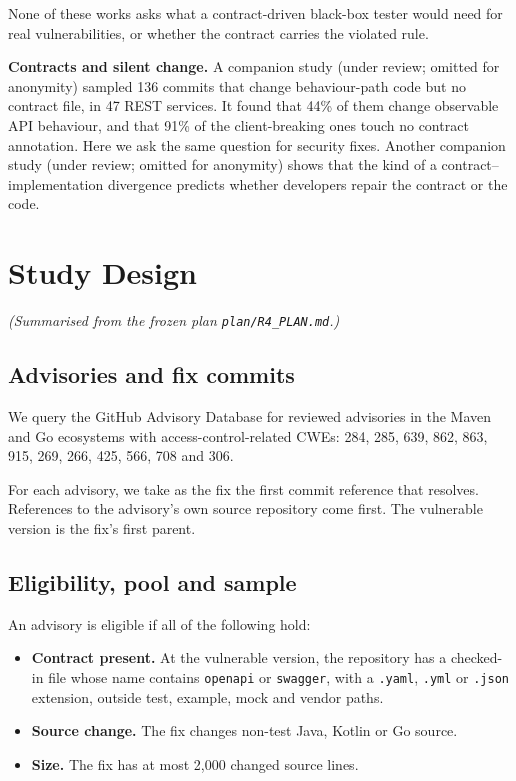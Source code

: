 \documentclass[conference]{IEEEtran}
\begin{document}
None of these works asks what a contract-driven black-box tester would need for real vulnerabilities, or whether the contract carries the violated rule.

\textbf{Contracts and silent change.} A companion study (under review; omitted for anonymity) sampled 136 commits that change behaviour-path code but no contract file, in 47 REST services. It found that 44\% of them change observable API behaviour, and that 91\% of the client-breaking ones touch no contract annotation. Here we ask the same question for security fixes. Another companion study (under review; omitted for anonymity) shows that the kind of a contract--implementation divergence predicts whether developers repair the contract or the code.

\section{Study Design}
\emph{(Summarised from the frozen plan \texttt{plan/\allowbreak{}R4\_PLAN.md}.)}

\subsection{Advisories and fix commits}
We query the GitHub Advisory Database for reviewed advisories in the Maven and Go ecosystems with access-control-related CWEs: 284, 285, 639, 862, 863, 915, 269, 266, 425, 566, 708 and 306.

For each advisory, we take as the fix the first commit reference that resolves. References to the advisory's own source repository come first. The vulnerable version is the fix's first parent.

\subsection{Eligibility, pool and sample}
An advisory is eligible if all of the following hold:
\begin{itemize}
\item \textbf{Contract present.} At the vulnerable version, the repository has a checked-in file whose name contains \texttt{openapi} or \texttt{swagger}, with a \texttt{.yaml}, \texttt{.yml} or \texttt{.json} extension, outside test, example, mock and vendor paths.
\item \textbf{Source change.} The fix changes non-test Java, Kotlin or Go source.
\item \textbf{Size.} The fix has at most 2,000 changed source lines.
\end{itemize}
\end{document}
